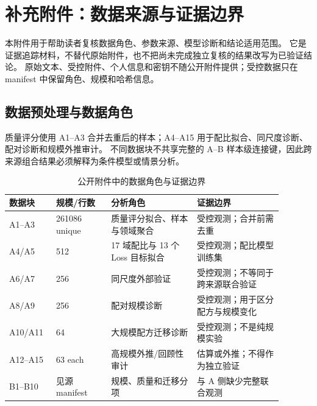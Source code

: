 
\section{补充附件：数据来源与证据边界}
\label{app:supplementary-evidence}

本附件用于帮助读者复核数据角色、参数来源、模型诊断和结论适用范围。
它是证据追踪材料，不替代原始附件，也不把尚未完成独立复核的结果改写为已验证结论。
原始文本、受控附件、个人信息和密钥不随公开附件提供；受控数据只在 manifest 中保留角色、规模和哈希信息。

\subsection{数据预处理与数据角色}
\label{app:supp-data-roles}

质量评分使用 A1--A3 合并去重后的样本；A4--A15 用于配比拟合、同尺度诊断、配对诊断和规模外推审计。
不同数据块不共享完整的 A--B 样本级连接键，因此跨来源组合结果必须解释为条件模型或情景分析。

\begin{table}[htbp]
\centering
\caption{公开附件中的数据角色与证据边界}
\label{tab:app-data-roles}
\small
\begin{tabular}{p{0.13\linewidth}p{0.18\linewidth}p{0.29\linewidth}p{0.29\linewidth}}
\toprule
数据块 & 规模/行数 & 分析角色 & 证据边界 \\
\midrule
A1--A3 & 261086 unique & 质量评分拟合、样本与领域聚合 & 受控观测；合并前需去重 \\
A4/A5 & 512 & 17 域配比与 13 个 Loss 目标拟合 & 受控观测；配比模型训练集 \\
A6/A7 & 256 & 同尺度外部验证 & 受控观测；不等同于跨来源联合验证 \\
A8/A9 & 256 & 配对规模诊断 & 受控观测；用于区分配方与规模变化 \\
A10/A11 & 64 & 大规模配方迁移诊断 & 受控观测；不是纯规模实验 \\
A12--A15 & 63 each & 高规模外推/回顾性审计 & 估算或外推；不得作为独立验证 \\
B1--B10 & 见源 manifest & 规模、质量和迁移分项 & 与 A 侧缺少完整联合观测 \\
\bottomrule
\end{tabular}
\end{table}

